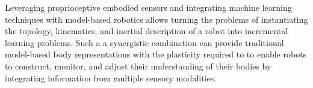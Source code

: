 Leveraging proprioceptive embodied sensors and integrating machine learning techniques with model-based robotics allows turning the problems of instantiating the topology, kinematics, and inertial description of a robot into incremental learning problems. Such a a synergistic combination can provide traditional model-based body representations with the plasticity required to to enable robots to construct, monitor, and adjust their understanding of their bodies by integrating information from multiple sensory modalities.%




